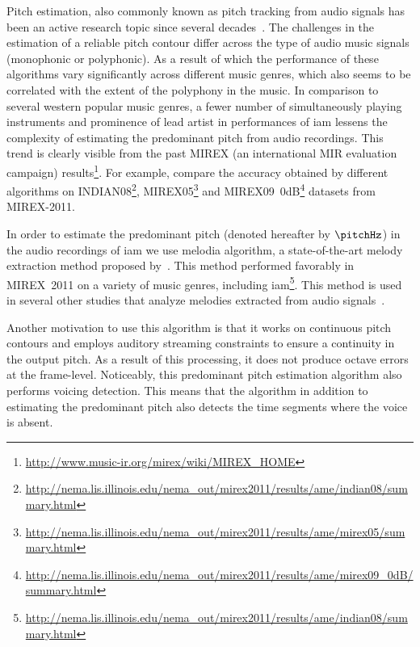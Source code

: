 {Pitch estimation, also commonly known as pitch tracking from audio signals has been an active research topic since several decades~\citep{salamon:phd:13}. The challenges in the estimation of a reliable pitch contour differ across the type of audio music signals (monophonic or polyphonic). As a result of which the performance of these algorithms vary significantly across different music genres, which also seems to be correlated with the extent of the polyphony in the music. In comparison to several western popular music genres, a fewer number of simultaneously playing instruments and prominence of lead artist in performances of \gls{iam} lessens the complexity of estimating the predominant pitch from audio recordings. This trend is clearly visible from the past MIREX (an international MIR evaluation campaign) results\footnote{\url{http://www.music-ir.org/mirex/wiki/MIREX_HOME}}. For example, compare the accuracy obtained by different algorithms on INDIAN08\footnote{\url{http://nema.lis.illinois.edu/nema_out/mirex2011/results/ame/indian08/summary.html}},  MIREX05\footnote{\url{http://nema.lis.illinois.edu/nema_out/mirex2011/results/ame/mirex05/summary.html}} and  MIREX09~0dB\footnote{\url{http://nema.lis.illinois.edu/nema_out/mirex2011/results/ame/mirex09_0dB/summary.html}} datasets from MIREX-2011. 

In order to estimate the predominant pitch (denoted hereafter by $\pitchHz$) in the audio recordings of \gls{iam} we use \gls{melodia} algorithm, a state-of-the-art melody extraction method proposed by~\cite{Salamon2012}. This method performed favorably in MIREX~2011 on a variety of music genres, including \gls{iam}\footnote{\url{http://nema.lis.illinois.edu/nema_out/mirex2011/results/ame/indian08/summary.html}}. This method is used in several other studies that analyze melodies extracted from audio signals~\citep{Dutta2014,Ishwar2013,Rao2014,koduri2014intonation,senturk2013score,pikrakis2012tracking}.

Another motivation to use this algorithm is that it works on continuous pitch contours and employs auditory streaming constraints to ensure a continuity in the output pitch. As a result of this processing, it does not produce octave errors at the frame-level. Noticeably, this predominant pitch estimation algorithm also performs voicing detection. This means that the algorithm in addition to estimating the predominant pitch also detects the time segments where the voice is absent. %

}
